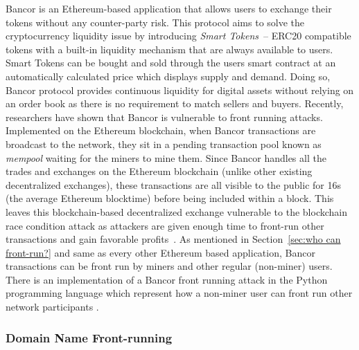 Bancor is an Ethereum-based application that allows users to exchange their tokens without any counter-party risk. This protocol aims to solve the cryptocurrency liquidity issue by introducing \textit{Smart Tokens}~\cite{hertzog2017bancor}-- ERC20 compatible tokens with a built-in liquidity mechanism that are always available to users. Smart Tokens can be bought and sold through the users smart contract at an automatically calculated price which displays supply and demand. Doing so, Bancor protocol provides continuous liquidity for digital assets without relying on an order book as there is no requirement to match sellers and buyers.
Recently, researchers have shown that Bancor is vulnerable to front running attacks. Implemented on the Ethereum blockchain, when Bancor transactions are broadcast to the network, they sit in a pending transaction pool known as \textit{mempool} waiting for the miners to mine them. Since Bancor handles all the trades and exchanges on the Ethereum blockchain (unlike other existing decentralized exchanges), these transactions are all visible to the public for 16s (the average Ethereum blocktime) before being included within a block. This leaves this blockchain-based decentralized exchange vulnerable to the blockchain race condition attack as attackers are given enough time to front-run other transactions and gain favorable profits~\cite{BancorIs7:online}. As mentioned in Section~\ref{sec:who can front-run?} and same as every other Ethereum based application, Bancor transactions can be front run by miners and other regular (non-miner) users. There is an implementation of a Bancor front running attack in the Python programming language which represent how a non-miner user can front run other network participants \cite{NewTab13:online}.



\subsubsection{Domain Name Front-running} \hfill\\    %

